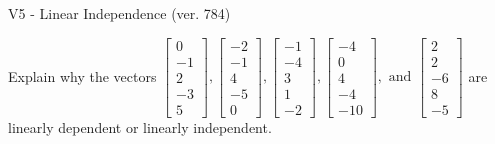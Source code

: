 \begin{exercise}
  \begin{exerciseTitle}V5 - Linear Independence (ver. 784)\end{exerciseTitle}
  \begin{exerciseStatement}
    Explain why the vectors \(\left[\begin{array}{r}
0 \\
-1 \\
2 \\
-3 \\
5
\end{array}\right] , \left[\begin{array}{r}
-2 \\
-1 \\
4 \\
-5 \\
0
\end{array}\right] , \left[\begin{array}{r}
-1 \\
-4 \\
3 \\
1 \\
-2
\end{array}\right] , \left[\begin{array}{r}
-4 \\
0 \\
4 \\
-4 \\
-10
\end{array}\right] , \text{ and } \left[\begin{array}{r}
2 \\
2 \\
-6 \\
8 \\
-5
\end{array}\right]\) are linearly dependent or linearly independent.	



\end{exerciseStatement}
\end{exercise}
